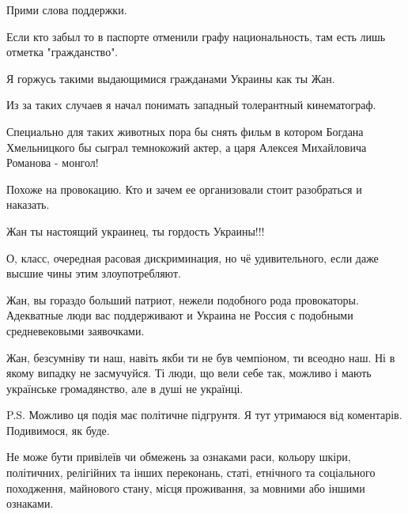 \begin{itemize}
Прими слова поддержки.

Если кто забыл то в паспорте отменили графу национальность, там есть лишь
отметка "гражданство".

Я горжусь такими выдающимися гражданами Украины как ты Жан.

Из за таких случаев я начал понимать западный толерантный кинематограф.

Специально для таких животных пора бы снять фильм в котором Богдана
Хмельницкого бы сыграл темнокожий актер, а царя Алексея Михайловича Романова -
монгол!


Похоже на провокацию. Кто и зачем ее организовали стоит разобраться и наказать.

Жан ты настоящий украинец, ты гордость Украины!!!


О, класс, очередная расовая дискриминация, но чё удивительного, если даже
высшие чины этим злоупотребляют.

Жан, вы гораздо больший патриот, нежели подобного рода провокаторы. Адекватные
люди вас поддерживают и Украина не Россия с подобными средневековыми
заявочками. 💛💙


 

Жан, безсумніву ти наш, навіть якби ти не був чемпіоном, ти всеодно наш. Ні в
якому випадку не засмучуйся. Ті люди, що вели себе так, можливо і мають
українське громадянство, але в душі не українці.

P.S. Можливо ця подія має політичне підгрунтя. Я тут утримаюся від коментарів.
Подивимося, як буде.


Не може бути привілеїв чи обмежень за ознаками раси, кольору шкіри, політичних,
релігійних та інших переконань, статі, етнічного та соціального походження,
майнового стану, місця проживання, за мовними або іншими ознаками.


\end{itemize}
